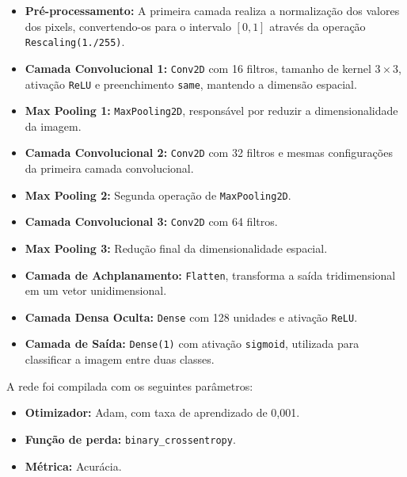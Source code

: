 \begin{itemize}
    \item \textbf{Pré-processamento:} A primeira camada realiza a normalização dos valores dos pixels, convertendo-os para o intervalo $[0, 1]$ através da operação \texttt{Rescaling(1./255)}.
    
    \item \textbf{Camada Convolucional 1:} \texttt{Conv2D} com 16 filtros, tamanho de kernel $3 \times 3$, ativação \texttt{ReLU} e preenchimento \texttt{same}, mantendo a dimensão espacial.
    
    \item \textbf{Max Pooling 1:} \texttt{MaxPooling2D}, responsável por reduzir a dimensionalidade da imagem.
    
    \item \textbf{Camada Convolucional 2:} \texttt{Conv2D} com 32 filtros e mesmas configurações da primeira camada convolucional.
    
    \item \textbf{Max Pooling 2:} Segunda operação de \texttt{MaxPooling2D}.
    
    \item \textbf{Camada Convolucional 3:} \texttt{Conv2D} com 64 filtros.
    
    \item \textbf{Max Pooling 3:} Redução final da dimensionalidade espacial.
    
    \item \textbf{Camada de Achplanamento:} \texttt{Flatten}, transforma a saída tridimensional em um vetor unidimensional.
    
    \item \textbf{Camada Densa Oculta:} \texttt{Dense} com 128 unidades e ativação \texttt{ReLU}.
    
    \item \textbf{Camada de Saída:} \texttt{Dense(1)} com ativação \texttt{sigmoid}, utilizada para classificar a imagem entre duas classes.
\end{itemize}

A rede foi compilada com os seguintes parâmetros:

\begin{itemize}
    \item \textbf{Otimizador:} Adam, com taxa de aprendizado de 0{,}001.
    \item \textbf{Função de perda:} \texttt{binary\_crossentropy}.
    \item \textbf{Métrica:} Acurácia.
\end{itemize}

